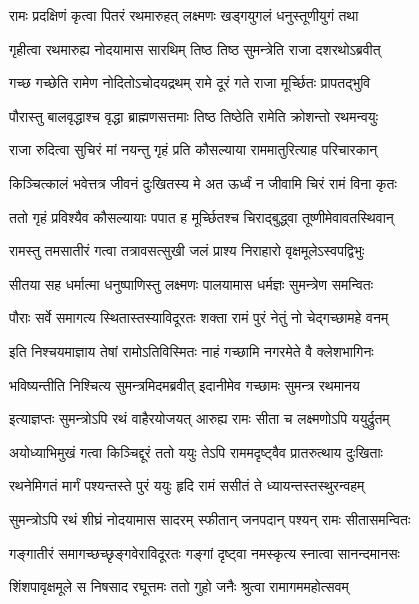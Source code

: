 \twolineshloka
{रामः प्रदक्षिणं कृत्वा पितरं रथमारुहत्}
{लक्ष्मणः खड्गयुगलं धनुस्तूणीयुगं तथा} %

\twolineshloka
{गृहीत्वा रथमारुह्य नोदयामास सारथिम्}
{तिष्ठ तिष्ठ सुमन्त्रेति राजा दशरथोऽब्रवीत्} %

\twolineshloka
{गच्छ गच्छेति रामेण नोदितोऽचोदयद्रथम्}
{रामे दूरं गते राजा मूर्च्छितः प्रापतद्भुवि} %

\twolineshloka
{पौरास्तु बालवृद्धाश्च वृद्धा ब्राह्मणसत्तमाः}
{तिष्ठ तिष्ठेति रामेति क्रोशन्तो रथमन्वयुः} %

\twolineshloka
{राजा रुदित्वा सुचिरं मां नयन्तु गृहं प्रति}
{कौसल्याया राममातुरित्याह परिचारकान्} %

\twolineshloka
{किञ्चित्कालं भवेत्तत्र जीवनं दुःखितस्य मे}
{अत ऊर्ध्वं न जीवामि चिरं रामं विना कृतः} %

\twolineshloka
{ततो गृहं प्रविश्यैव कौसल्यायाः पपात ह}
{मूर्च्छितश्च चिराद्बुद्ध्वा तूष्णीमेवावतस्थिवान्} %

\twolineshloka
{रामस्तु तमसातीरं गत्वा तत्रावसत्सुखी}
{जलं प्राश्य निराहारो वृक्षमूलेऽस्वपद्विभुः} %

\twolineshloka
{सीतया सह धर्मात्मा धनुष्पाणिस्तु लक्ष्मणः}
{पालयामास धर्मज्ञः सुमन्त्रेण समन्वितः} %

\twolineshloka
{पौराः सर्वे समागत्य स्थितास्तस्याविदूरतः}
{शक्ता रामं पुरं नेतुं नो चेद्गच्छामहे वनम्} %

\twolineshloka
{इति निश्चयमाज्ञाय तेषां रामोऽतिविस्मितः}
{नाहं गच्छामि नगरमेते वै क्लेशभागिनः} %

\twolineshloka
{भविष्यन्तीति निश्चित्य सुमन्त्रमिदमब्रवीत्}
{इदानीमेव गच्छामः सुमन्त्र रथमानय} %

\twolineshloka
{इत्याज्ञप्तः सुमन्त्रोऽपि रथं वाहैरयोजयत्}
{आरुह्य रामः सीता च लक्ष्मणोऽपि ययुर्द्रुतम्} %

\twolineshloka
{अयोध्याभिमुखं गत्वा किञ्चिद्दूरं ततो ययुः}
{तेऽपि राममदृष्ट्वैव प्रातरुत्थाय दुःखिताः} %

\twolineshloka
{रथनेमिगतं मार्गं पश्यन्तस्ते पुरं ययुः}
{हृदि रामं ससीतं ते ध्यायन्तस्तस्थुरन्वहम्} %

\twolineshloka
{सुमन्त्रोऽपि रथं शीघ्रं नोदयामास सादरम्}
{स्फीतान् जनपदान् पश्यन् रामः सीतासमन्वितः} %

\twolineshloka
{गङ्गातीरं समागच्छच्छृङ्गवेराविदूरतः}
{गङ्गां दृष्ट्वा नमस्कृत्य स्नात्वा सानन्दमानसः} %

\twolineshloka
{शिंशपावृक्षमूले स निषसाद रघूत्तमः}
{ततो गुहो जनैः श्रुत्वा रामागममहोत्सवम्} %

